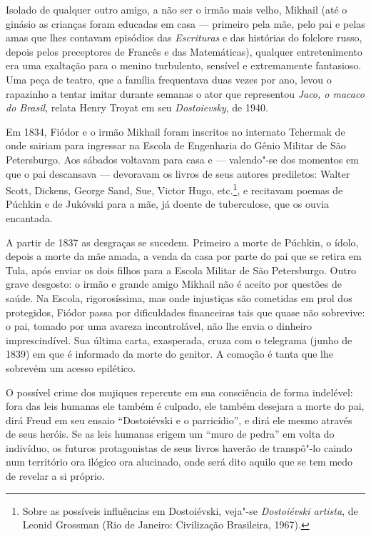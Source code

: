 Isolado de qualquer outro amigo, a não ser o irmão mais velho, Mikhail
(até o ginásio as crianças foram educadas em casa --- primeiro pela mãe,
pelo pai e pelas amas que lhes contavam episódios das \emph{Escrituras} e das
histórias do folclore russo, depois pelos preceptores de Francês e das
Matemáticas), qualquer entretenimento era uma exaltação para o menino
turbulento, sensível e extremamente fantasioso. Uma peça de teatro, que
a família frequentava duas vezes por ano, levou o rapazinho a tentar
imitar durante semanas o ator que representou \emph{Jaco, o macaco do
Brasil}, relata Henry Troyat em seu \emph{Dostoievsky}, de 1940.

Em 1834, Fiódor e o irmão Mikhail foram inscritos no internato Tchermak
de onde sairiam para ingressar na Escola de Engenharia do Gênio Militar
de São Petersburgo. Aos sábados voltavam para casa e --- valendo"-se dos
momentos em que o pai descansava --- devoravam os livros de seus autores
prediletos: Walter Scott, Dickens, George Sand, Sue, Victor Hugo, etc.\footnote{Sobre as
possíveis influências em Dostoiévski, veja"-se \emph{Dostoiévski artista}, de Leonid Grossman (Rio de Janeiro: Civilização Brasileira, 1967).}, e recitavam poemas de Púchkin e
de Jukóvski para a mãe, já doente de tuberculose, que os ouvia
encantada.

A partir de 1837 as desgraças se sucedem. Primeiro a morte de Púchkin, o
ídolo, depois a morte da mãe amada, a venda da casa por parte do pai que
se retira em Tula, após enviar os dois filhos para a Escola Militar de
São Petersburgo. Outro grave desgosto: o irmão e grande amigo Mikhail
não é aceito por questões de saúde. Na Escola, rigorosíssima, mas onde
injustiças são cometidas em prol dos protegidos, Fiódor passa por
dificuldades financeiras tais que quase não sobrevive: o pai, tomado por
uma avareza incontrolável, não lhe envia o dinheiro imprescindível. Sua
última carta, exasperada, cruza com o telegrama (junho de 1839) em que é
informado da morte do genitor. A comoção é tanta que lhe sobrevém um
acesso epilético.

O possível crime dos mujiques repercute em sua consciência de forma indelével:
fora das leis humanas ele também é culpado, ele também desejara a morte
do pai, dirá Freud em seu ensaio ``Dostoiévski e o parricídio'', e dirá
ele mesmo através de seus heróis. Se as leis humanas erigem um ``muro
de pedra'' em volta do indivíduo, os futuros protagonistas de seus
livros haverão de transpô"-lo caindo num território ora ilógico ora
alucinado, onde será dito aquilo que se tem medo de revelar a si
próprio.

